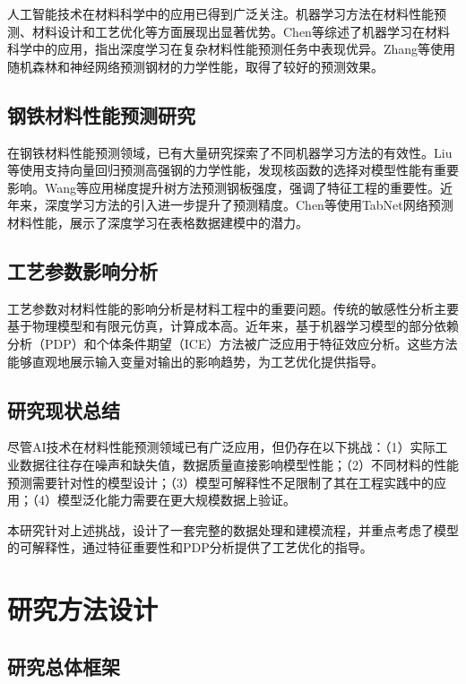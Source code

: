 \documentclass[12pt,a4paper]{article}
\begin{document}
人工智能技术在材料科学中的应用已得到广泛关注。机器学习方法在材料性能预测、材料设计和工艺优化等方面展现出显著优势。Chen等\cite{chen2020}综述了机器学习在材料科学中的应用，指出深度学习在复杂材料性能预测任务中表现优异。Zhang等\cite{zhang2021}使用随机森林和神经网络预测钢材的力学性能，取得了较好的预测效果。

\subsection{钢铁材料性能预测研究}

在钢铁材料性能预测领域，已有大量研究探索了不同机器学习方法的有效性。Liu等\cite{liu2019}使用支持向量回归预测高强钢的力学性能，发现核函数的选择对模型性能有重要影响。Wang等\cite{wang2020}应用梯度提升树方法预测钢板强度，强调了特征工程的重要性。近年来，深度学习方法的引入进一步提升了预测精度。Chen等\cite{chen2022}使用TabNet网络预测材料性能，展示了深度学习在表格数据建模中的潜力。

\subsection{工艺参数影响分析}

工艺参数对材料性能的影响分析是材料工程中的重要问题。传统的敏感性分析主要基于物理模型和有限元仿真，计算成本高。近年来，基于机器学习模型的部分依赖分析（PDP）和个体条件期望（ICE）方法被广泛应用于特征效应分析。这些方法能够直观地展示输入变量对输出的影响趋势，为工艺优化提供指导。

\subsection{研究现状总结}

尽管AI技术在材料性能预测领域已有广泛应用，但仍存在以下挑战：（1）实际工业数据往往存在噪声和缺失值，数据质量直接影响模型性能；（2）不同材料的性能预测需要针对性的模型设计；（3）模型可解释性不足限制了其在工程实践中的应用；（4）模型泛化能力需要在更大规模数据上验证。

本研究针对上述挑战，设计了一套完整的数据处理和建模流程，并重点考虑了模型的可解释性，通过特征重要性和PDP分析提供了工艺优化的指导。

\section{研究方法设计}

\subsection{研究总体框架}
\end{document}
